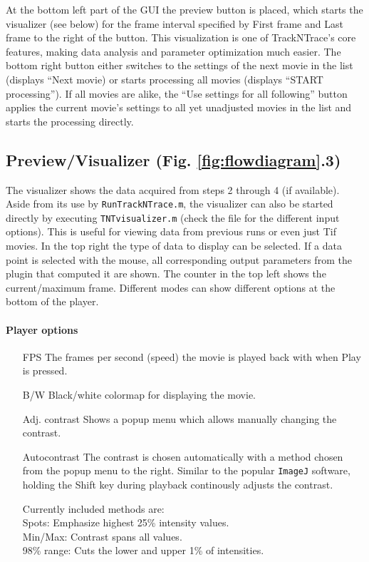 \documentclass[11pt,onside]{report}
\numberwithin{equation}{chapter}
\begin{document}
At the bottom left part of the GUI the preview button is placed, which starts the visualizer (see below) for the frame interval specified by   \textsf{First frame} and \textsf{Last frame} to the right of the button. This visualization is one of TrackNTrace's core features, making data analysis and parameter optimization much easier. The bottom right button either switches to the settings of the next movie in the list (displays ``\textsf{Next movie}) or starts processing all movies (displays ``\textsf{START processing}''). If all movies are alike, the ``\textsf{Use settings for all following}'' button applies the current movie's settings to all yet unadjusted movies in the list and starts the processing directly.\\[10pt]

\subsection{Preview/Visualizer (Fig. \ref{fig:flowdiagram}.3)}
The visualizer shows the data acquired from steps 2 through 4 (if available). Aside from its use by \texttt{RunTrackNTrace.m}, the visualizer can also be started directly by executing \texttt{TNTvisualizer.m} (check the file for the different input options). This is useful for viewing data from previous runs or even just Tif movies. In the top right the type of data to display can be selected. If a data point is selected with the mouse, all corresponding output parameters from the plugin that computed it are shown. The counter in the top left shows the current/maximum frame. Different modes can show different options at the bottom of the player.

\paragraph{Player options}
\begin{itemize}[leftmargin=3cm]
\item[\textsf{FPS}] The frames per second (speed) the movie is played back with when \textsf{Play} is pressed.
\item[\textsf{B/W}] Black/white colormap for displaying the movie.
\item[\textsf{Adj. contrast}] Shows a popup menu which allows manually changing the contrast.
\item[\textsf{Autocontrast}] The contrast is chosen automatically with a method chosen from the popup menu to the right. Similar to the popular \texttt{ImageJ} software, holding the \textsf{Shift} key during playback continously adjusts the contrast.
\item[] Currently included methods are: \\\hspace*{0.35cm}Spots: Emphasize highest 25\% intensity values.\\\hspace*{0.35cm}Min/Max: Contrast spans all values.\\\hspace*{0.35cm}98\% range: Cuts the lower and upper 1\% of intensities. 
\end{itemize} 
\end{document}
